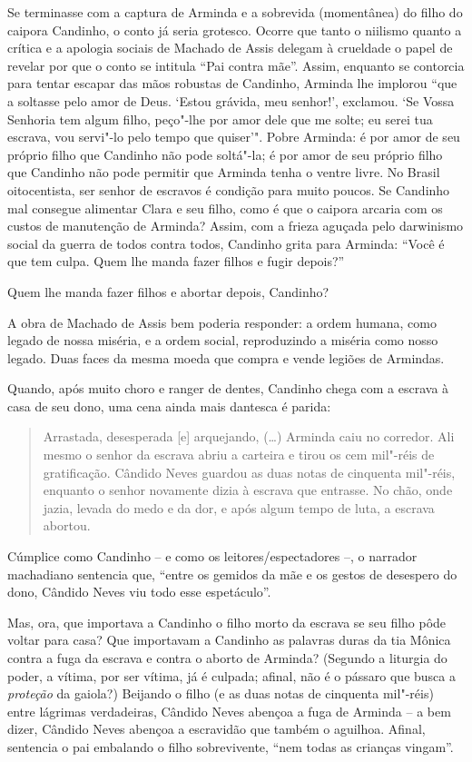 Se terminasse com a captura de Arminda e a sobrevida (momentânea) do
filho do caipora Candinho, o conto já seria grotesco. Ocorre que tanto o
niilismo quanto a crítica e a apologia sociais de Machado de Assis
delegam à crueldade o papel de revelar por que o conto se intitula ``Pai
contra mãe''. Assim, enquanto se contorcia para tentar escapar das mãos
robustas de Candinho, Arminda lhe implorou ``que a soltasse pelo amor de
Deus. `Estou grávida, meu senhor!', exclamou. `Se Vossa Senhoria tem
algum filho, peço"-lhe por amor dele que me solte; eu serei tua escrava,
vou servi"-lo pelo tempo que quiser'". Pobre Arminda: é por amor de seu
próprio filho que Candinho não pode soltá"-la; é por amor de seu próprio
filho que Candinho não pode permitir que Arminda tenha o ventre livre.
No Brasil oitocentista, ser senhor de escravos é condição para muito
poucos. Se Candinho mal consegue alimentar Clara e seu filho, como é que
o caipora arcaria com os custos de manutenção de Arminda? Assim, com a
frieza aguçada pelo darwinismo social da guerra de todos contra todos,
Candinho grita para Arminda: ``Você é que tem culpa. Quem lhe manda
fazer filhos e fugir depois?''

Quem lhe manda fazer filhos e abortar depois, Candinho?

A obra de Machado de Assis bem poderia responder: a ordem humana, como
legado de nossa miséria, e a ordem social, reproduzindo a miséria como
nosso legado. Duas faces da mesma moeda que compra e vende legiões de
Armindas.

Quando, após muito choro e ranger de dentes, Candinho chega com a
escrava à casa de seu dono, uma cena ainda mais dantesca é parida:

\begin{quote}
Arrastada, desesperada {[}e{]} arquejando, (\ldots{}) Arminda caiu no
corredor. Ali mesmo o senhor da escrava abriu a carteira e tirou os cem
mil"-réis de gratificação. Cândido Neves guardou as duas notas de
cinquenta mil"-réis, enquanto o senhor novamente dizia à escrava que
entrasse. No chão, onde jazia, levada do medo e da dor, e após algum
tempo de luta, a escrava abortou.
\end{quote}

Cúmplice como Candinho -- e como os leitores/espectadores %
--, o narrador
machadiano sentencia que, ``entre os gemidos da mãe e os gestos de
desespero do dono, Cândido Neves viu todo esse espetáculo''.

Mas, ora, que importava a Candinho o filho morto da escrava se seu filho
pôde voltar para casa? Que importavam a Candinho as palavras duras da
tia Mônica contra a fuga da escrava e contra o aborto de Arminda?
(Segundo a liturgia do poder, a vítima, por ser vítima, já é culpada;
afinal, não é o pássaro que busca a \emph{proteção} da gaiola?) Beijando
o filho (e as duas notas de cinquenta mil"-réis) entre lágrimas
verdadeiras, Cândido Neves abençoa a fuga de Arminda -- a bem dizer,
Cândido Neves abençoa a escravidão que também o aguilhoa. Afinal,
sentencia o pai embalando o filho sobrevivente, ``nem todas as crianças
vingam''.

